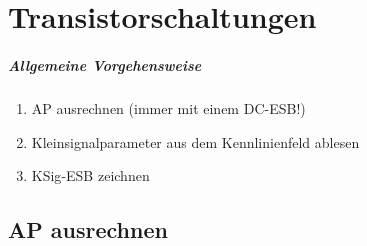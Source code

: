
\chapter{Transistorschaltungen}

\paragraph{Allgemeine Vorgehensweise}

\begin{enumerate}
	\item \acs{AP} ausrechnen (immer mit einem DC-\acs{ESB}!)
	\item Kleinsignalparameter aus dem Kennlinienfeld ablesen
	\item \acs{KSig}-\acs{ESB} zeichnen
\end{enumerate}

\section{AP ausrechnen}


